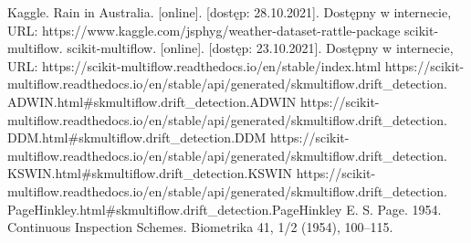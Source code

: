 \documentclass{classrep}
\begin{document}
    \begin{thebibliography}{0}
        {Kaggle. Rain in Australia. [online]. [dostęp: 28.10.2021]. Dostępny w internecie, URL:
        https://www.kaggle.com/jsphyg/weather-dataset-rattle-package}
        {scikit-multiflow. scikit-multiflow. [online]. [dostęp: 23.10.2021].
        Dostępny w internecie, URL: https://scikit-multiflow.readthedocs.io/en/stable/index.html}
        {https://scikit-multiflow.readthedocs.io/en/stable/api/generated/skmultiflow.drift\_detection.\\
        ADWIN.html#skmultiflow.drift\_detection.ADWIN}
        {https://scikit-multiflow.readthedocs.io/en/stable/api/generated/skmultiflow.drift\_detection.\\
        DDM.html#skmultiflow.drift\_detection.DDM}
        {https://scikit-multiflow.readthedocs.io/en/stable/api/generated/skmultiflow.drift\_detection.\\
        KSWIN.html#skmultiflow.drift\_detection.KSWIN}
        {https://scikit-multiflow.readthedocs.io/en/stable/api/generated/skmultiflow.drift\_detection.\\
        PageHinkley.html#skmultiflow.drift\_detection.PageHinkley}
        {E. S. Page. 1954. Continuous Inspection Schemes. Biometrika 41, 1/2 (1954), 100–115.}
    \end{thebibliography}
\end{document}
